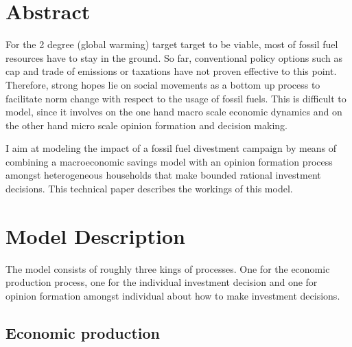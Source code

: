 \section{Abstract}

For the 2 degree (global warming) target target to be viable, most of fossil fuel resources have to stay in the ground. So far, conventional policy options such as cap and trade of emissions or taxations have not proven effective to this point. Therefore, strong hopes lie on social movements as a bottom up process to facilitate norm change with respect to the usage of fossil fuels.
This is difficult to model, since it involves on the one hand macro scale economic dynamics and on the other hand micro scale opinion formation and decision making.

I aim at modeling the impact of a fossil fuel divestment campaign by means of combining a macroeconomic savings model with an opinion formation process amongst heterogeneous households that make bounded rational investment decisions.
This technical paper describes the workings of this model.

\section{Model Description}

The model consists of roughly three kings of processes. One for the economic production process, one for the individual investment decision and one for opinion formation amongst individual about how to make investment decisions.

\subsection{Economic production}

